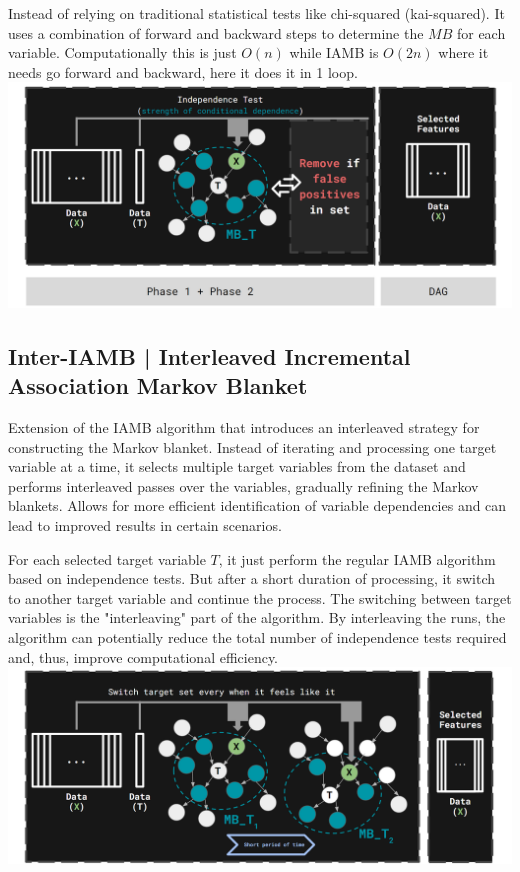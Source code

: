 \documentclass{article}
\begin{document}
Instead of relying on traditional statistical tests like chi-squared (kai-squared). 
It uses a combination of forward and backward steps to determine the $MB$ for each variable.
Computationally this is just $O(n)$ while IAMB is $O(2n)$ where it needs go forward and backward, here it does it in 1 loop.
\includegraphics[width=\textwidth,height=\textheight,keepaspectratio]{fastiamb.png}


\subsection{Inter-IAMB | Interleaved Incremental Association Markov Blanket}
Extension of the IAMB algorithm that introduces an interleaved strategy for constructing the Markov blanket. 
Instead of iterating and processing one target variable at a time, it selects multiple target variables from the dataset and performs interleaved passes over the variables, gradually refining the Markov blankets. 
Allows for more efficient identification of variable dependencies and can lead to improved results in certain scenarios.

For each selected target variable $T$, it just perform the regular IAMB algorithm based on independence tests.
But after a short duration of processing, it switch to another target variable and continue the process. 
The switching between target variables is the "interleaving" part of the algorithm. 
By interleaving the runs, the algorithm can potentially reduce the total number of independence tests required and, thus, improve computational efficiency.
\includegraphics[width=\textwidth,height=\textheight,keepaspectratio]{interiamb.png}
\end{document}
